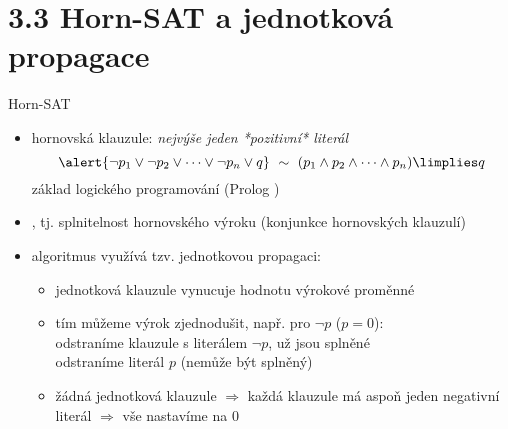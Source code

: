 \documentclass{beamer}
\begin{document}
\section{3.3 Horn-SAT a jednotková propagace}


\begin{frame}{Horn-SAT}

    \begin{itemize}
        \item \alert{hornovská klauzule}: \emph{nejvýše jeden *pozitivní* literál}\pause
        $$
        \alert{\neg p_1\lor \neg p_2\lor \dots \lor \neg p_n\lor q}\ \sim\ (p_1\land p_2\land\dots \land p_n)\limplies q
        $$
        \pause
        základ logického programování (Prolog )\pause
        \item {}, tj. splnitelnost \alert{hornovského} výroku (konjunkce hornovských klauzulí) \pause
        \item algoritmus využívá tzv. \alert{jednotkovou propagaci}:  
        \begin{itemize}[<+->]
            \item jednotková klauzule vynucuje hodnotu výrokové proměnné
            \item tím můžeme výrok zjednodušit, např. pro $\neg p$ ($p=0$):\\
            odstraníme klauzule s literálem $\neg p$, už jsou splněné\\
            odstraníme literál $p$ (nemůže být splněný)
            \item žádná jednotková klauzule $\Rightarrow$ každá klauzule má \alert{aspoň jeden negativní literál} $\Rightarrow$ vše nastavíme na 0
        \end{itemize}    
    \end{itemize}
    
\end{frame}
\end{document}
